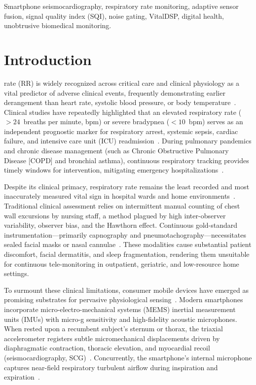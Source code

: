 \documentclass[journal]{IEEEtran}
\begin{document}
\begin{IEEEkeywords}
Smartphone seismocardiography, respiratory rate monitoring, adaptive sensor fusion, signal quality index (SQI), noise gating, VitalDSP, digital health, unobtrusive biomedical monitoring.
\end{IEEEkeywords}

\section{Introduction}
 rate (RR) is widely recognized across critical care and clinical physiology as a vital predictor of adverse clinical events, frequently demonstrating earlier derangement than heart rate, systolic blood pressure, or body temperature~\cite{cretikos2008}. Clinical studies have repeatedly highlighted that an elevated respiratory rate ($> 24$~breaths per minute, bpm) or severe bradypnea ($< 10$~bpm) serves as an independent prognostic marker for respiratory arrest, systemic sepsis, cardiac failure, and intensive care unit (ICU) readmission~\cite{subbe2003, pimentel2017}. During pulmonary pandemics and chronic disease management (such as Chronic Obstructive Pulmonary Disease [COPD] and bronchial asthma), continuous respiratory tracking provides timely windows for intervention, mitigating emergency hospitalizations~\cite{liu2021}.

Despite its clinical primacy, respiratory rate remains the least recorded and most inaccurately measured vital sign in hospital wards and home environments~\cite{lovett2019}. Traditional clinical assessment relies on intermittent manual counting of chest wall excursions by nursing staff, a method plagued by high inter-observer variability, observer bias, and the Hawthorn effect. Continuous gold-standard instrumentation—primarily capnography and pneumotachography—necessitates sealed facial masks or nasal cannulae~\cite{folke2003}. These modalities cause substantial patient discomfort, facial dermatitis, and sleep fragmentation, rendering them unsuitable for continuous tele-monitoring in outpatient, geriatric, and low-resource home settings.

To surmount these clinical limitations, consumer mobile devices have emerged as promising substrates for pervasive physiological sensing~\cite{topol2019}. Modern smartphones incorporate micro-electro-mechanical systems (MEMS) inertial measurement units (IMUs) with micro-g sensitivity and high-fidelity acoustic microphones. When rested upon a recumbent subject's sternum or thorax, the triaxial accelerometer registers subtle micromechanical displacements driven by diaphragmatic contraction, thoracic elevation, and myocardial recoil (seismocardiography, SCG)~\cite{dirienzo2018}. Concurrently, the smartphone's internal microphone captures near-field respiratory turbulent airflow during inspiration and expiration~\cite{alshaer2020}.
\end{document}
